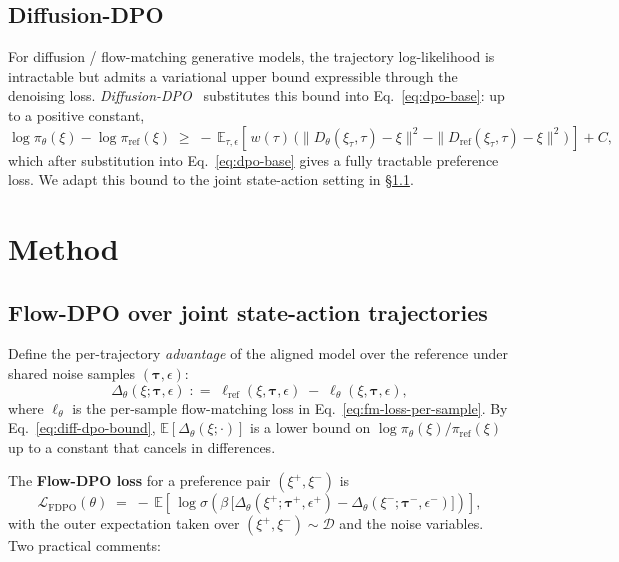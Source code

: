 \documentclass[11pt]{article}
\newcommand{\coloneqq}{\mathrel{\vcentcolon=}}
\providecommand{\vcentcolon}{\mathrel{\mathop{:}}}
\newcommand{\Dtheta}{D_\theta}
\newcommand{\Dref}{D_{\mathrm{ref}}}
\newcommand{\Etau}{\mathbb{E}_{\tau,\epsilon}}
\begin{document}
\subsection{Diffusion-DPO}
\label{sec:bg-diffdpo}

For diffusion / flow-matching generative models, the trajectory log-likelihood is intractable but admits a variational upper bound expressible through the denoising loss. \emph{Diffusion-DPO}~\cite{wallace2024diffusion} substitutes this bound into Eq.~\eqref{eq:dpo-base}: up to a positive constant,
\begin{equation}
    \log \pi_\theta(\xi) - \log \pi_{\mathrm{ref}}(\xi)
    \;\geq\; -\,\Etau\!\left[\, w(\tau)\,\big(\|\Dtheta(\xi_\tau, \tau) - \xi\|^2 - \|\Dref(\xi_\tau, \tau) - \xi\|^2\big) \,\right]
    + C,
    \label{eq:diff-dpo-bound}
\end{equation}
which after substitution into Eq.~\eqref{eq:dpo-base} gives a fully tractable preference loss. We adapt this bound to the joint state-action setting in \S\ref{sec:flow-dpo}.

\section{Method}
\label{sec:method}

\subsection{Flow-DPO over joint state-action trajectories}
\label{sec:flow-dpo}

Define the per-trajectory \emph{advantage} of the aligned model over the reference under shared noise samples $(\boldsymbol{\tau}, \epsilon)$:
\begin{equation}
    \Delta_\theta(\xi; \boldsymbol{\tau}, \epsilon)
    \;\coloneqq\;
    \ell_{\mathrm{ref}}(\xi, \boldsymbol{\tau}, \epsilon) \;-\; \ell_\theta(\xi, \boldsymbol{\tau}, \epsilon),
    \label{eq:advantage}
\end{equation}
where $\ell_\theta$ is the per-sample flow-matching loss in Eq.~\eqref{eq:fm-loss-per-sample}. By Eq.~\eqref{eq:diff-dpo-bound}, $\mathbb{E}[\Delta_\theta(\xi;\cdot)]$ is a lower bound on $\log\pi_\theta(\xi)/\pi_{\mathrm{ref}}(\xi)$ up to a constant that cancels in differences.

The \textbf{Flow-DPO loss} for a preference pair $(\xi^+, \xi^-)$ is
\begin{equation}
    \boxed{\,
    \mathcal{L}_{\mathrm{FDPO}}(\theta)
    \;=\; -\,\mathbb{E}\!\left[\,
        \log \sigma\!\left(
            \beta\,\big[\Delta_\theta(\xi^+; \boldsymbol{\tau}^+, \epsilon^+) - \Delta_\theta(\xi^-; \boldsymbol{\tau}^-, \epsilon^-)\big]
        \right)
    \right],\,}
    \label{eq:flow-dpo}
\end{equation}
with the outer expectation taken over $(\xi^+, \xi^-) \sim \mathcal{D}$ and the noise variables. Two practical comments:
\end{document}
